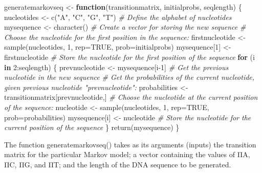 \documentclass[
]{book}
\newenvironment{Shaded}{\begin{snugshade}}{\end{snugshade}}
\newcommand{\AttributeTok}[1]{\textcolor[rgb]{0.77,0.63,0.00}{#1}}
\newcommand{\CommentTok}[1]{\textcolor[rgb]{0.56,0.35,0.01}{\textit{#1}}}
\newcommand{\ConstantTok}[1]{\textcolor[rgb]{0.00,0.00,0.00}{#1}}
\newcommand{\ControlFlowTok}[1]{\textcolor[rgb]{0.13,0.29,0.53}{\textbf{#1}}}
\newcommand{\DecValTok}[1]{\textcolor[rgb]{0.00,0.00,0.81}{#1}}
\newcommand{\FunctionTok}[1]{\textcolor[rgb]{0.00,0.00,0.00}{#1}}
\newcommand{\NormalTok}[1]{#1}
\newcommand{\OtherTok}[1]{\textcolor[rgb]{0.56,0.35,0.01}{#1}}
\newcommand{\SpecialCharTok}[1]{\textcolor[rgb]{0.00,0.00,0.00}{#1}}
\newcommand{\StringTok}[1]{\textcolor[rgb]{0.31,0.60,0.02}{#1}}
\begin{document}
\begin{Shaded}
\begin{Highlighting}[]
\NormalTok{generatemarkovseq }\OtherTok{\textless{}{-}} \ControlFlowTok{function}\NormalTok{(transitionmatrix, initialprobs, seqlength)}
\NormalTok{\{}
\NormalTok{nucleotides     }\OtherTok{\textless{}{-}} \FunctionTok{c}\NormalTok{(}\StringTok{"A"}\NormalTok{, }\StringTok{"C"}\NormalTok{, }\StringTok{"G"}\NormalTok{, }\StringTok{"T"}\NormalTok{) }\CommentTok{\# Define the alphabet of nucleotides}
\NormalTok{mysequence      }\OtherTok{\textless{}{-}} \FunctionTok{character}\NormalTok{()           }\CommentTok{\# Create a vector for storing the new sequence}
\CommentTok{\# Choose the nucleotide for the first position in the sequence:}
\NormalTok{firstnucleotide }\OtherTok{\textless{}{-}} \FunctionTok{sample}\NormalTok{(nucleotides, }\DecValTok{1}\NormalTok{, }\AttributeTok{rep=}\ConstantTok{TRUE}\NormalTok{, }\AttributeTok{prob=}\NormalTok{initialprobs)}
\NormalTok{mysequence[}\DecValTok{1}\NormalTok{]   }\OtherTok{\textless{}{-}}\NormalTok{ firstnucleotide       }\CommentTok{\# Store the nucleotide for the first position of the sequence}
\ControlFlowTok{for}\NormalTok{ (i }\ControlFlowTok{in} \DecValTok{2}\SpecialCharTok{:}\NormalTok{seqlength)}
\NormalTok{\{}
\NormalTok{prevnucleotide }\OtherTok{\textless{}{-}}\NormalTok{ mysequence[i}\DecValTok{{-}1}\NormalTok{]     }\CommentTok{\# Get the previous nucleotide in the new sequence}
\CommentTok{\# Get the probabilities of the current nucleotide, given previous nucleotide "prevnucleotide":}
\NormalTok{probabilities  }\OtherTok{\textless{}{-}}\NormalTok{ transitionmatrix[prevnucleotide,]}
\CommentTok{\# Choose the nucleotide at the current position of the sequence:}
\NormalTok{nucleotide     }\OtherTok{\textless{}{-}} \FunctionTok{sample}\NormalTok{(nucleotides, }\DecValTok{1}\NormalTok{, }\AttributeTok{rep=}\ConstantTok{TRUE}\NormalTok{, }\AttributeTok{prob=}\NormalTok{probabilities)}
\NormalTok{mysequence[i]  }\OtherTok{\textless{}{-}}\NormalTok{ nucleotide          }\CommentTok{\# Store the nucleotide for the current position of the sequence}
\NormalTok{\}}
\FunctionTok{return}\NormalTok{(mysequence)}
\NormalTok{\}}
\end{Highlighting}
\end{Shaded}

The function generatemarkovseq() takes as its arguments (inputs) the transition matrix for the particular Markov model; a vector containing the values of ΠA, ΠC, ΠG, and ΠT; and the length of the DNA sequence to be generated.
\end{document}
